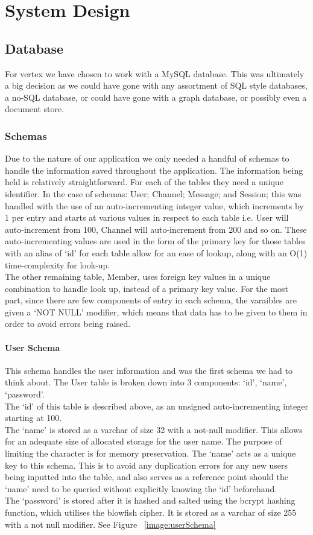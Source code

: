 \chapter{System Design}
\section{Database}
For vertex we have chosen to work with a MySQL database. This was ultimately a big decision as we could have gone with any assortment of SQL style databases, a no-SQL database, or could have gone with a graph database, or possibly even a document store.

\subsection{Schemas}
Due to the nature of our application we only needed a handful of schemas to handle the information saved throughout the application. The information being held is relatively straightforward. For each of the tables they need a unique identifier. In the case of schemas: User; Channel; Message; and Session; this was handled with the use of an auto-incrementing integer value, which increments by 1 per entry and starts at various values in respect to each table i.e. User will auto-increment from 100, Channel will auto-increment from 200 and so on. These auto-incrementing values are used in the form of the primary key for those tables with an alias of ‘id’ for each table allow for an ease of lookup, along with an O(1) time-complexity for look-up.
\\ The other remaining table, Member, uses foreign key values in a unique combination to handle look up, instead of a primary key value. For the most part, since there are few components of entry in each schema, the varaibles are given a ‘NOT NULL’ modifier, which means that data has to be given to them in order to avoid errors being raised.

\subsubsection{User Schema}
This schema handles the user information and was the first schema we had to think about. The User table is broken down into 3 components: ‘id’, ‘name’, ‘password’.
\\The ‘id’ of this table is described above, as an unsigned auto-incrementing integer starting at 100.
\\The ‘name’ is stored as a varchar of size 32 with a not-null modifier. This allows for an adequate size of allocated storage for the user name. The purpose of limiting the character is for memory preservation. The ‘name’ acts as a unique key to this schema. This is to avoid any duplication errors for any new users being inputted into the table, and also serves as a reference point should the ‘name’ need to be queried without explicitly knowing the ‘id’ beforehand. 
\\The ‘password’ is stored after it is hashed and salted using the bcrypt hashing function, which utilises the blowfish cipher. It is stored as a varchar of size 255 with a not null modifier.
See Figure ~\ref{image:userSchema}

